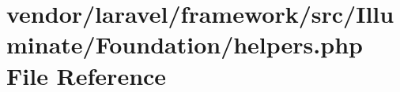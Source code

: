 \section{vendor/laravel/framework/src/\+Illuminate/\+Foundation/helpers.php File Reference}
\label{laravel_2framework_2src_2_illuminate_2_foundation_2helpers_8php}
